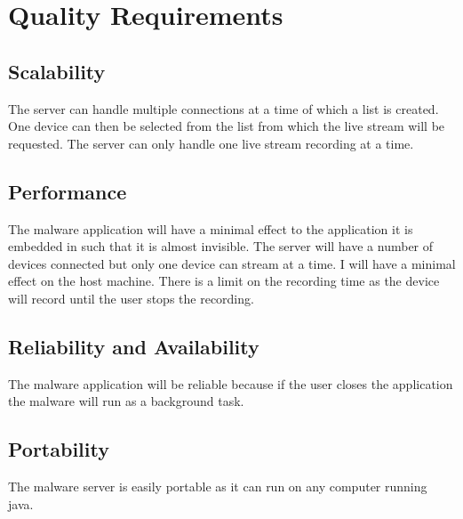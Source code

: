 \section{Quality Requirements}
\subsection{Scalability}
The server can handle multiple connections at a time of which a list is created. One device can then be selected from the list from which the live stream will be requested. The server can only handle one live stream recording at a time.

\subsection{Performance}
The malware application will have a minimal effect to the application it is embedded in such that it is almost invisible. The server will have a number of devices connected but only one device can stream at a time. I will have a minimal effect on the host machine. There is a limit on the recording time as the device will record until the user stops the recording. 

\subsection{Reliability and Availability}
The malware application will be reliable because if the user closes the application the malware will run as a background task.

\subsection{Portability}
The malware server is easily portable as it can run on any computer running java.
